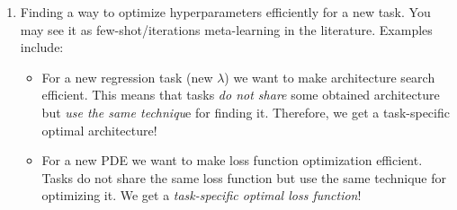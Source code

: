 \begin{itemize}
\begin{enumerate}[font={\bfseries},label={Problem (\arabic*):}]
		\item Finding a way to optimize hyperparameters efficiently for a new task. 
		You may see it as few-shot/iterations meta-learning in the literature.
		Examples include:
		\begin{itemize}
			\item For a new regression task (new $\lambda$) we want to make architecture search efficient. This means that tasks \textit{do not share} some obtained architecture but \textit{use the same techniqu}e for finding it. Therefore, we get a task-specific optimal architecture! 
			\item For a new PDE we want to make loss function optimization efficient. Tasks do not share the same loss function but use the same technique for optimizing it. We get a \textit{task-specific optimal loss function}! 
		\end{itemize}
	\end{enumerate}
\end{itemize}

